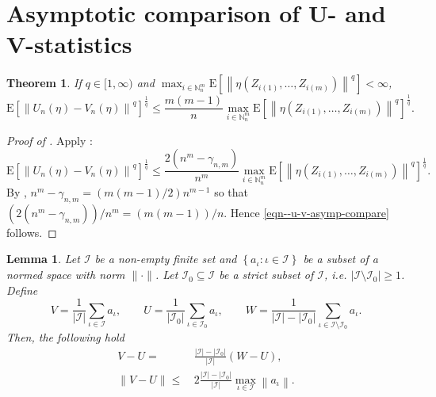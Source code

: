 \documentclass[12pt]{article}
\numberwithin{equation}{section}
\theoremstyle{definition}
\theoremstyle{plain}
\newtheorem{theorem}{Theorem}[section]
\newtheorem{lemma}{Lemma}[section]
\begin{document}
\section{Asymptotic comparison of U- and V-statistics}

\begin{theorem}
\label{thm--u-v-asymp-compare}
If \(q \in [1, \infty)\) and \(\max_{i \in \mathbb{N}_{n}^{m}} \mathrm{E} \left[
\left\| \eta \left( Z_{i (1)}, \dots, Z_{i (m)} \right) \right\|^{q} \right] <
\infty\),
\begin{equation}
  \mathrm{E} \left[ \left\| U_{n} (\eta) - V_{n} (\eta) \right\|^{q}
  \right]^{\frac{1}{q}} \leq \frac{m (m - 1)}{n} \max_{i \in \mathbb{N}_{n}^{m}}
  \mathrm{E} \left[ \left\| \eta \left( Z_{i (1)}, \dots, Z_{i (m)} \right)
  \right\|^{q} \right]^{\frac{1}{q}}.
  \label{eqn--u-v-asymp-compare}
\end{equation}
\end{theorem}

\begin{proof}[Proof of ]
Apply :
\begin{equation*}
  \mathrm{E} \left[ \left\| U_{n} (\eta) - V_{n} (\eta) \right\|^{q}
  \right]^{\frac{1}{q}} \leq \frac{2 \left( n^{m} - \gamma_{n, m}
  \right)}{n^{m}}
  \max_{i \in \mathbb{N}_{n}^{m}}
  \mathrm{E} \left[ \left\| \eta \left( Z_{i (1)}, \dots, Z_{i (m)} \right)
  \right\|^{q} \right]^{\frac{1}{q}}.
\end{equation*}
By , \(n^{m} - \gamma_{n, m} = (m (m - 1) / 2) n^{m - 1}\)
so that \(\left( 2 \left( n^{m} - \gamma_{n, m} \right) \right) / n^{m} = (m (m
- 1)) / n\).
Hence \eqref{eqn--u-v-asymp-compare} follows.
\end{proof}

\begin{lemma}
\label{lem--VUW-comparison-fundamental}
Let \(\mathcal{I}\) be a non-empty finite set and \(\left\{ a_{\iota} : \iota
\in \mathcal{I} \right\}\) be a subset of a normed space with norm
\(\|\cdot\|\).
Let \(\mathcal{I}_{0} \subseteq \mathcal{I}\) be a strict subset of
\(\mathcal{I}\), i.e. \(\left| \mathcal{I} \setminus \mathcal{I}_{0} \right|
\geq 1\).
Define
\begin{equation}
  V = \frac{1}{|\mathcal{I}|} \sum_{\iota \in \mathcal{I}} a_{\iota}, \qquad U =
  \frac{1}{\left| \mathcal{I}_{0} \right|} \sum_{\iota \in \mathcal{I}_{0}}
  a_{\iota}, \qquad W = \frac{1}{|\mathcal{I}| - \left| \mathcal{I}_{0} \right|}
  \sum_{\iota \in \mathcal{I} \setminus \mathcal{I}_{0}} a_{\iota}.
  \label{eqn--VUW-comparison-fundamental-VUW-defs}
\end{equation}
Then, the following hold
\begin{align}
  V - U =
  & \, \frac{|\mathcal{I}| - \left| \mathcal{I}_{0} \right|}{|\mathcal{I}|} (W
  - U),
  \label{eqn--VUW-comparison-fundamental-main}
  \\
  \|V - U\| \leq
  & \, 2 \frac{|\mathcal{I}| - \left| \mathcal{I}_{0} \right|}{|\mathcal{I}|}
  \max_{\iota \in \mathcal{I}} \left\| a_{\iota} \right\|.
  \label{eqn--VUW-comparison-fundamental-norm-bound}
\end{align}
\end{lemma}
\end{document}

